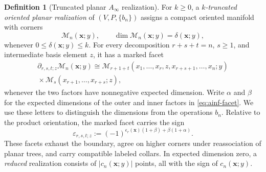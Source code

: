 \documentclass[11pt,letterpaper,twoside]{article}
\theoremstyle{plain}
\theoremstyle{definition}
\newtheorem{definition}[theorem]{Definition}
\theoremstyle{remark}
\newcommand{\Ainf}{A_\infty}
\begin{document}
\begin{definition}[Truncated planar \(\Ainf\) realization]\label{def:truncated-ainf-realization}
For \(k\geq0\), a \emph{\(k\)-truncated oriented planar realization} of \((V,P,\{b_n\})\) assigns a compact oriented manifold with corners
\[
 \mathcal M_n(\mathbf x;y),
 \qquad
 \dim\mathcal M_n(\mathbf x;y)=\delta(\mathbf x;y),
\]
whenever \(0\leq\delta(\mathbf x;y)\leq k\).  For every decomposition \(r+s+t=n\), \(s\geq1\), and intermediate basis element \(z\), it has a marked facet
\begin{multline}\label{eq:ainf-facet}
 \partial_{r,s,t;z}\mathcal M_n(\mathbf x;y)
 \cong
 \mathcal M_{r+1+t}
 (x_1,\ldots,x_r,z,x_{r+s+1},\ldots,x_n;y)
 \\
 {}\times
 \mathcal M_s(x_{r+1},\ldots,x_{r+s};z),
\end{multline}
whenever the two factors have nonnegative expected dimension.  Write \(\alpha\) and \(\beta\) for the expected dimensions of the outer and inner factors in \eqref{eq:ainf-facet}.  We use these letters to distinguish the dimensions from the operations \(b_n\).  Relative to the product orientation, the marked facet carries the sign
\begin{equation}\label{eq:ainf-facet-sign}
 \varepsilon_{r,s,t;z}
 :=(-1)^{\epsilon_r(\mathbf x)(1+\beta)+\beta(1+\alpha)}.
\end{equation}
These facets exhaust the boundary, agree on higher corners under reassociation of planar trees, and carry compatible labeled collars.  In expected dimension zero, a \emph{reduced} realization consists of \(|c_n(\mathbf x;y)|\) points, all with the sign of \(c_n(\mathbf x;y)\).
\end{definition}
\end{document}
